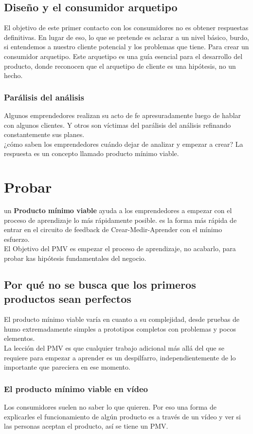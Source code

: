 \documentclass[10pt]{article}
\begin{document}
\begin{multicols}{2}
\subsection*{Diseño y el consumidor arquetipo}
El objetivo de este primer contacto con los consumidores no es obtener respuestas definitivas. En lugar de eso, lo que se pretende es aclarar a un nivel básico, burdo, si entendemos a nuestro cliente potencial y los problemas que tiene. Para crear un consumidor arquetipo. Este arquetipo es una guía esencial para el desarrollo del producto, donde reconocen que el arquetipo de cliente es una hipótesis, no un hecho.
\subsubsection*{Parálisis del análisis}
Algunos emprendedores realizan su acto de fe apresuradamente luego de hablar con algunos clientes. Y otros son víctimas del parálisis del análisis refinando constantemente sus planes.\\
{\color{blue}¿cómo saben los emprendedores cuándo dejar de analizar y empezar a crear? La respuesta es un concepto llamado producto mínimo viable.}
\section*{Probar}
un \textbf{Producto mínimo viable} ayuda a los emprendedores a empezar con el proceso de aprendizaje lo más rápidamente posible. es la forma más rápida de entrar en el circuito de feedback de Crear-Medir-Aprender con el mínimo esfuerzo.\\
{\color{blue} El Objetivo del PMV es empezar el proceso de aprendizaje, no acabarlo, para probar kas hipótesis fundamentales del negocio.}
\subsection*{Por qué no se busca que los primeros productos sean perfectos}
El producto mínimo viable varía en cuanto a su complejidad, desde pruebas de humo extremadamente simples a prototipos completos con problemas y pocos elementos. \\
La lección del PMV es que cualquier trabajo adicional más allá del que se requiere para empezar a aprender es un despilfarro, independientemente de lo importante que pareciera en ese momento.\\
\subsubsection*{El producto mínimo viable en vídeo}
Los consumidores suelen no saber lo que quieren. Por eso una forma de explicarles el funcionamiento de algún producto es a través de un vídeo y ver si las personas aceptan el producto, así se tiene un PMV.

\end{multicols}
\end{document}
